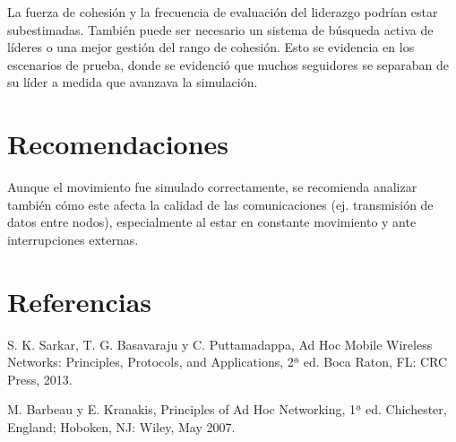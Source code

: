 \documentclass{article}
\begin{document}
La fuerza de cohesión y la frecuencia de evaluación del liderazgo podrían estar subestimadas. También puede ser necesario un sistema de búsqueda activa de líderes o una mejor gestión del rango de cohesión. Esto se evidencia en los escenarios de prueba, donde se evidenció que muchos seguidores se separaban de su líder a medida que avanzava la simulación.

\section{Recomendaciones}\label{secrecomen}

Aunque el movimiento fue simulado correctamente, se recomienda analizar también cómo este afecta la calidad de las comunicaciones (ej. transmisión de datos entre nodos), especialmente al estar en constante movimiento y ante interrupciones externas.

\section{Referencias}
\renewcommand{\refname}{}
\begin{thebibliography}{9}

 \label{ref:AdHoc} S. K. Sarkar, T. G. Basavaraju y C. Puttamadappa,
Ad Hoc Mobile Wireless Networks: Principles, Protocols, and Applications, 2ª ed.
Boca Raton, FL: CRC Press, 2013.

 \label{ref:PrinciplesAdHoc} M. Barbeau y E. Kranakis, Principles of Ad Hoc
Networking, 1ª ed. Chichester, England; Hoboken, NJ: Wiley, May 2007.

\end{thebibliography}
\end{document}
